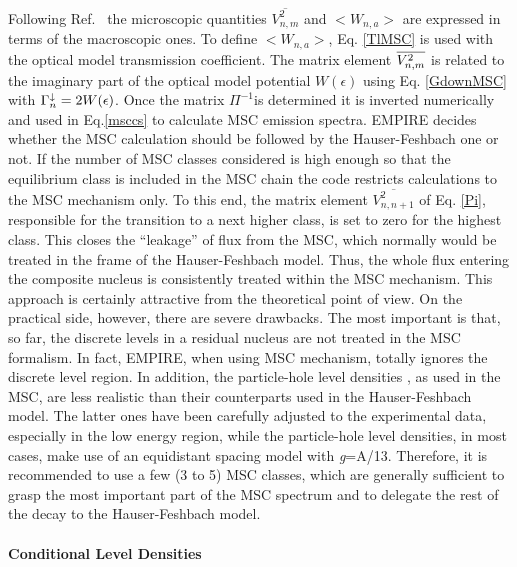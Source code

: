 Following Ref.~\cite{HRW} the microscopic quantities $%
\overline{V_{n,m}^{2}}$ and $<W_{n,a}>$ are expressed in terms of the
macroscopic ones. To define $<W_{n,a}>$, Eq. \ref{TlMSC} is used with the
optical model transmission coefficient. The matrix element $\overline{%
V_{n,m}^{2}}$ is related to the imaginary part of the optical model
potential $W(\epsilon)$ using Eq. \ref{GdownMSC} with $\Gamma_{n}^{%
\downarrow}=2W(\epsilon)$. Once the matrix $\Pi^{-1}$is determined it is
inverted numerically and used in Eq.\ref{msccs} to calculate MSC%
 emission spectra. EMPIRE decides whether the MSC calculation
should be followed by the Hauser-Feshbach%
 one or not. If the number of MSC classes considered
is high enough so that the equilibrium class is included in the MSC chain
the code restricts calculations to the MSC mechanism only. To this end, the
matrix element $%
\overline{V_{n,n+1}^{2}}$ of Eq. \ref{Pi}, responsible for the transition to
a next higher class, is set to zero for the highest class. This closes the
{}``leakage'' of flux from the MSC, which normally would be treated in the
frame of the Hauser-Feshbach%
 model. Thus, the whole flux entering the composite
nucleus is consistently treated within the MSC mechanism. This approach is
certainly attractive from the theoretical point of view. On the practical
side, however, there are severe drawbacks. The most important is that, so
far, the discrete levels in a residual nucleus are not treated in the MSC%
 formalism. In fact, EMPIRE, when using MSC mechanism, totally
ignores the discrete level region. In addition, the particle-hole level
densities%
, as used in the MSC, are less realistic than their
counterparts used in the Hauser-Feshbach%
 model. The latter ones have been carefully adjusted
to the experimental data, especially in the low energy region, while the
particle-hole level densities, in most cases, make use of an equidistant
spacing model with \emph{g}=A/13. Therefore, it is recommended to use a few
(3 to 5) MSC%
 classes, which are generally sufficient to grasp the most
important part of the MSC spectrum and to delegate the rest of the decay to
the Hauser-Feshbach model.

\medskip

\paragraph{Conditional Level Densities}

